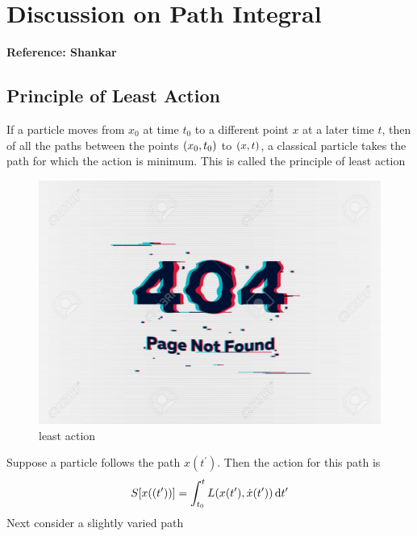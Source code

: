 		\section{Discussion on Path Integral}
		\textbf{Reference: Shankar}
		\subsection{Principle of Least Action}
		If a particle moves from $x_0$ at time $t_0$ to a different point $x$ at a later time $t$, then of all the paths between the points $\qty(x_0, t_0)$ to $\qty(x,t)$, a classical particle takes the path for which the action is minimum. This is called the principle of least action
		
		\begin{figure}
			\centering
			\includegraphics[width=0.5\linewidth]{Pictures/not-found.jpg}
			\caption{least action}
		\end{figure}
		Suppose a particle follows the path $x(t^\prime)$. Then the action for this path is
		\begin{equation}
			S\qty[x(\qty(t^\prime))] = \int_{t_0}^{t} L(x(t^\prime), \dot{x}(t^\prime)) \dd{t^\prime}
		\end{equation}
		Next consider a slightly varied path
		
